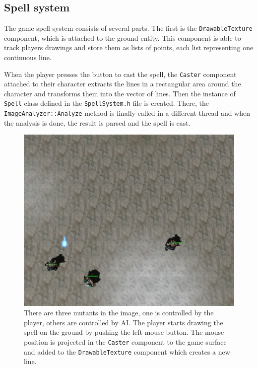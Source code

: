 \subsection{Spell system}
The game spell system consists of several parts. The first is the \texttt{DrawableTexture} component, which is attached to the ground entity. This component is able to track players drawings and store them as lists of points, each list representing one continuous line.

When the player presses the button to cast the spell, the \texttt{Caster} component attached to their character extracts the lines in a rectangular area around the character and transforms them into the vector of lines. Then the instance of \texttt{Spell} class defined in the \texttt{SpellSystem.h} file is created. There, the \texttt{ImageAnalyzer::Analyze} method is finally called in a different thread and when the analysis is done, the result is parsed and the spell is cast.

\begin{figure}[p]
\centering
\includegraphics[width=.9\linewidth]{ext/scr/komix1.png}
\caption{There are three mutants in the image, one is controlled by the player, others are controlled by AI. The player starts drawing the spell on the ground by pushing the left mouse button. The mouse position is projected in the \texttt{Caster} component to the game surface and added to the \texttt{DrawableTexture} component which creates a new line.}
\label{fig:start}
\end{figure}

